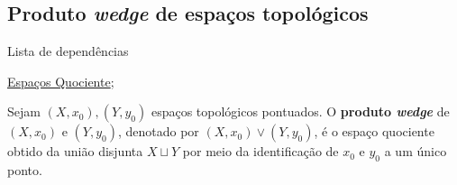 \subsection{Produto \emph{wedge} de espaços topológicos} %
\label{produto-wedge-def}
\begin{titlemize}{Lista de dependências}
	\item \hyperref[topologia-quociente-def]{Espaços Quociente};\\ %
\end{titlemize}

\begin{defi}
    Sejam $(X,x_0),(Y,y_0)$ espaços topológicos pontuados. O \textbf{produto \emph{wedge}} de $(X,x_0)$ e $(Y,y_0)$, denotado por $(X,x_0)\vee (Y,y_0)$, é o espaço quociente obtido da união disjunta $X\sqcup Y$ por meio da identificação de $x_0$ e $y_0$ a um único ponto. 
\end{defi}




